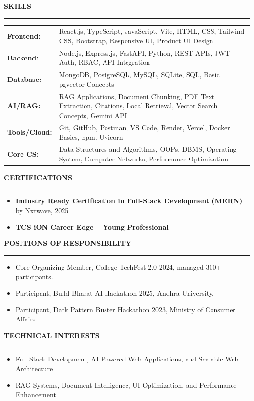 \documentclass[a4paper,10pt]{article}
\newcommand{\mysection}[1]{%
\vspace{2pt}
\noindent\textbf{\large #1}
\vspace{1pt}
\hrule
\vspace{2pt}
}
\begin{document}
\mysection{SKILLS}
\begin{tabularx}{\linewidth}{@{}l X@{}}
\textbf{Frontend:} & React.js, TypeScript, JavaScript, Vite, HTML, CSS, Tailwind CSS, Bootstrap, Responsive UI, Product UI Design \\
\textbf{Backend:} & Node.js, Express.js, FastAPI, Python, REST APIs, JWT Auth, RBAC, API Integration \\
\textbf{Database:} & MongoDB, PostgreSQL, MySQL, SQLite, SQL, Basic pgvector Concepts \\
\textbf{AI/RAG:} & RAG Applications, Document Chunking, PDF Text Extraction, Citations, Local Retrieval, Vector Search Concepts, Gemini API \\
\textbf{Tools/Cloud:} & Git, GitHub, Postman, VS Code, Render, Vercel, Docker Basics, npm, Uvicorn \\
\textbf{Core CS:} & Data Structures and Algorithms, OOPs, DBMS, Operating System, Computer Networks, Performance Optimization \\
\end{tabularx}

\mysection{CERTIFICATIONS}
\begin{itemize}
\item \textbf{Industry Ready Certification in Full-Stack Development (MERN)} by Nxtwave, 2025
\item \textbf{TCS iON Career Edge -- Young Professional}
\end{itemize}

\mysection{POSITIONS OF RESPONSIBILITY}
\begin{itemize}
\item Core Organizing Member, College TechFest 2.0 2024, managed 300+ participants.
\item Participant, Build Bharat AI Hackathon 2025, Andhra University.
\item Participant, Dark Pattern Buster Hackathon 2023, Ministry of Consumer Affairs.
\end{itemize}

\mysection{TECHNICAL INTERESTS}
\begin{itemize}
\item Full Stack Development, AI-Powered Web Applications, and Scalable Web Architecture
\item RAG Systems, Document Intelligence, UI Optimization, and Performance Enhancement
\end{itemize}

\vspace{-10pt}
\end{document}
